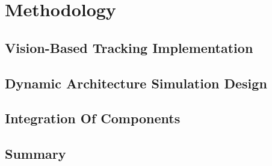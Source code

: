 \chapter{Methodology}

\section{Vision-Based Tracking Implementation}

\section{Dynamic Architecture Simulation Design}

\section{Integration Of Components}

\section{Summary}
